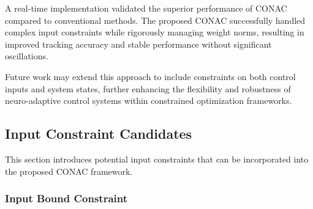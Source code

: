 \documentclass[journal]{IEEEtran}
\begin{document}
A real-time implementation validated the superior performance of CONAC compared to conventional methods. 
The proposed CONAC successfully handled complex input constraints while rigorously managing weight norms, resulting in improved tracking accuracy and stable performance without significant oscillations.

Future work may extend this approach to include constraints on both control inputs and system states, further enhancing the flexibility and robustness of neuro-adaptive control systems within constrained optimization frameworks.

\appendix

\subsection{Input Constraint Candidates}\label{sec:appen:cstr} 

This section introduces potential input constraints that can be incorporated into the proposed CONAC framework.

\subsubsection{Input Bound Constraint}\label{sec:appen:cstr:input:bound}
\end{document}
